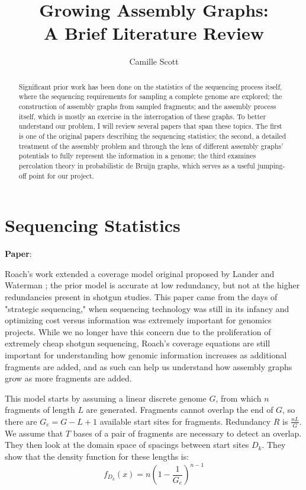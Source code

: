 \documentclass[]{article}
\title{Growing Assembly Graphs:\\
	   A Brief Literature Review}
\author{Camille Scott}
\begin{document}
\maketitle

\begin{abstract}
Significant prior work has been done on the statistics
of the sequencing process itself, where the sequencing requirements for sampling
a complete genome are explored; the construction of assembly graphs from sampled 
fragments; and the assembly process itself, which is mostly an exercise in the 
interrogation of these graphs. To better understand our problem, I will review several 
papers that span these topics. The first is one of the original papers describing the
sequencing statistics; the second, a 
detailed treatment of the assembly problem and through the lens of different assembly
graphs' potentials to fully represent the information in a genome; the third examines
percolation theory in probabilistic de Bruijn graphs, which serves as a useful jumping-off
point for our project.
\end{abstract}

\section{Sequencing Statistics}

\textbf{Paper}: 

Roach's work extended a coverage model original proposed by Lander and Waterman 
\cite{lander_genomic_1988}; the prior model is accurate at low redundancy, but not at the 
higher redundancies present in shotgun studies. This paper came from the days of 
"strategic sequencing," when 
sequencing technology was still in its infancy and optimizing cost versus information was 
extremely important for genomics projects. While we no longer have this concern due to 
the proliferation of extremely cheap shotgun sequencing, Roach's coverage equations are 
still important for understanding how genomic information increases as additional 
fragments are added, and as such can help us understand how assembly graphs grow as more 
fragments are added.

This model starts by assuming a linear discrete genome $G$, from which $n$ fragments
of length $L$ are generated. Fragments cannot overlap the end of $G$, so there are
$G_e = G-L+1$ available start sites for fragments. Redundancy $R$ is $\frac{nL}{G}$. We 
assume that $T$ bases of a pair of fragments are necessary to detect an overlap. They 
then look at the domain space of spacings between start sites $D_k$. They show that the 
density  function for these lengths is: $$f_{D_k}(x) = n(1 - \frac{1}{G_e})^{n-1}$$
\end{document}
